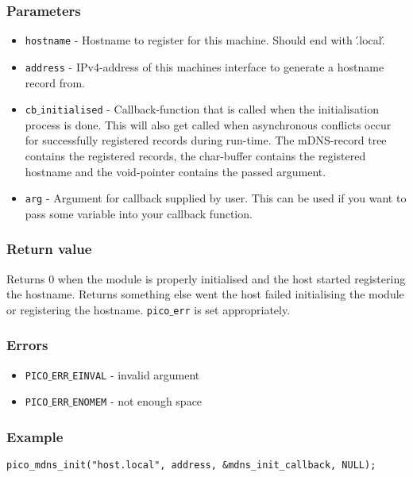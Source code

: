 \subsubsection*{Parameters}
\begin{itemize}[noitemsep]
\item \texttt{hostname} - Hostname to register for this machine. Should end with \'.local\'.
\item \texttt{address} - IPv4-address of this machines interface to generate a hostname record from.
\item \texttt{cb$\_$initialised} - Callback-function that is called when the initialisation process is done. This will also get called when asynchronous conflicts occur for successfully registered records during run-time. The mDNS-record tree contains the registered records, the char-buffer contains the registered hostname and the void-pointer contains the passed argument.
\item \texttt{arg} - Argument for callback supplied by user. This can be used if you want to pass some variable into your callback function.
\end{itemize}

\subsubsection*{Return value}
Returns 0 when the module is properly initialised and the host started registering the hostname. Returns something else went the host failed initialising the module or registering the hostname. \texttt{pico$\_$err} is set appropriately.

\subsubsection*{Errors}
\begin{itemize}[noitemsep]
\item \texttt{PICO$\_$ERR$\_$EINVAL} - invalid argument
\item \texttt{PICO$\_$ERR$\_$ENOMEM} - not enough space
\end{itemize}

\subsubsection*{Example}
\begin{verbatim}
pico_mdns_init("host.local", address, &mdns_init_callback, NULL);
\end{verbatim}


